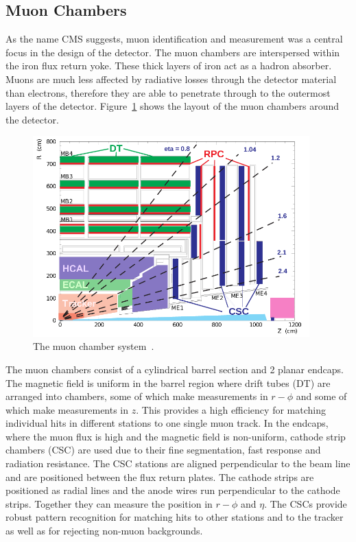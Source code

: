 \subsection{Muon Chambers}
As the name CMS suggests, muon identification and measurement was a central focus in the design of the detector. The muon chambers are interspersed within the iron flux return yoke. These thick layers of iron act as a hadron absorber. Muons are much less affected by radiative losses through the detector material than electrons, therefore they are able to penetrate through to the outermost layers of the detector. Figure~\ref{fig:muonchamber} shows the layout of the muon chambers around the detector. 
\begin{figure}[ht!]
\centering
    \includegraphics[width=0.95\textwidth]{images/MuonChambers.png}
    \caption{The muon chamber system~\cite{Kim:2012ix}.}
    \label{fig:muonchamber}
\end{figure}
The muon chambers consist of a cylindrical barrel section and 2 planar endcaps. The magnetic field is uniform in the barrel region where drift tubes (DT) are arranged into chambers, some of which make measurements in $r-\phi$ and some of which make measurements in $z$. This provides a high efficiency for matching individual hits in different stations to one single muon track.
In the endcaps, where the muon flux is high and the magnetic field is non-uniform, cathode strip chambers (CSC) are used due to their fine segmentation, fast response and radiation resistance. The CSC stations are aligned perpendicular to the beam line and are positioned between the flux return plates. The cathode strips are positioned as radial lines and the anode wires run perpendicular to the cathode strips. Together they can measure the position in $r-\phi$ and $\eta$. The CSCs provide robust pattern recognition for matching hits to other stations and to the tracker as well as for rejecting non-muon backgrounds. 

